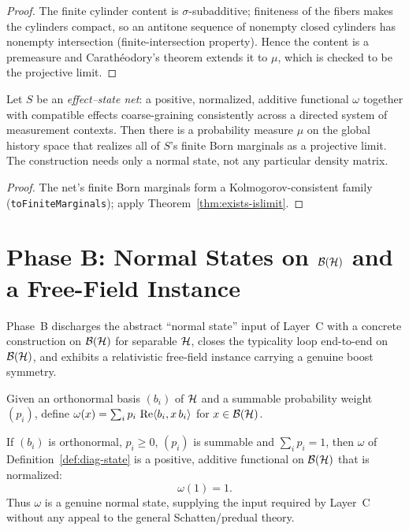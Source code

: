 \begin{proof}
  \leanok
  The finite cylinder content is $\sigma$-subadditive; finiteness of the fibers makes
  the cylinders compact, so an antitone sequence of nonempty closed cylinders has
  nonempty intersection (finite-intersection property). Hence the content is a
  premeasure and Carath\'eodory's theorem extends it to $\mu$, which is checked to be
  the projective limit.
\end{proof}

\begin{theorem}
  \label{thm:exists-typicality}
  \leanok
  Let $S$ be an \emph{effect--state net}: a positive, normalized, additive functional
  $\omega$ together with compatible effects coarse-graining consistently across a
  directed system of measurement contexts. Then there is a probability measure $\mu$
  on the global history space that realizes all of $S$'s finite Born marginals as a
  projective limit. The construction needs only a normal state, not any particular
  density matrix.
\end{theorem}

\begin{proof}
  \leanok
  The net's finite Born marginals form a Kolmogorov-consistent family
  (\texttt{toFiniteMarginals}); apply Theorem~\ref{thm:exists-islimit}.
\end{proof}


\chapter{Phase B: Normal States on $\mathcal{B}(\mathcal{H})$ and a Free-Field Instance}
\label{chap:phaseB}

Phase~B discharges the abstract ``normal state'' input of Layer~C with a concrete
construction on $\mathcal{B}(\mathcal{H})$ for separable $\mathcal{H}$, closes the typicality loop end-to-end on
$\mathcal{B}(\mathcal{H})$, and exhibits a relativistic free-field instance carrying a genuine boost
symmetry.

\begin{definition}
  \label{def:diag-state}
  Given an orthonormal basis $(b_i)$ of $\mathcal{H}$ and a summable probability weight
  $(p_i)$, define $\omega(x) = \sum_i p_i\,\operatorname{Re}\langle b_i, x\,b_i\rangle$ for
  $x \in \mathcal{B}(\mathcal{H})$.
\end{definition}

\begin{theorem}
  \label{thm:normal-state}
  \leanok
  If $(b_i)$ is orthonormal, $p_i \ge 0$, $(p_i)$ is summable and $\sum_i p_i = 1$,
  then $\omega$ of Definition~\ref{def:diag-state} is a positive, additive functional
  on $\mathcal{B}(\mathcal{H})$ that is normalized:
  \[
    \omega(1) = 1 .
  \]
  Thus $\omega$ is a genuine normal state, supplying the input required by
  Layer~C without any appeal to the general Schatten/predual theory.
\end{theorem}

